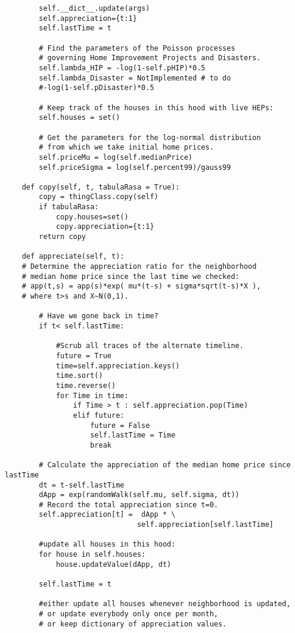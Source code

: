\begin{lstlisting}
        self.__dict__.update(args)
        self.appreciation={t:1}
        self.lastTime = t

        # Find the parameters of the Poisson processes
        # governing Home Improvement Projects and Disasters.
        self.lambda_HIP = -log(1-self.pHIP)*0.5
        self.lambda_Disaster = NotImplemented # to do
        #-log(1-self.pDisaster)*0.5

        # Keep track of the houses in this hood with live HEPs:
        self.houses = set()

        # Get the parameters for the log-normal distribution
        # from which we take initial home prices.
        self.priceMu = log(self.medianPrice)
        self.priceSigma = log(self.percent99)/gauss99
    
    def copy(self, t, tabulaRasa = True):
        copy = thingClass.copy(self)
        if tabulaRasa:
            copy.houses=set()
            copy.appreciation={t:1}
        return copy
            
    def appreciate(self, t):
    # Determine the appreciation ratio for the neighborhood
    # median home price since the last time we checked:
    # app(t,s) = app(s)*exp( mu*(t-s) + sigma*sqrt(t-s)*X ),
    # where t>s and X~N(0,1).

        # Have we gone back in time?
        if t< self.lastTime:
            
            #Scrub all traces of the alternate timeline.
            future = True
            time=self.appreciation.keys()
            time.sort()
            time.reverse()
            for Time in time:
                if Time > t : self.appreciation.pop(Time)
                elif future:
                    future = False
                    self.lastTime = Time
                    break                

        # Calculate the appreciation of the median home price since lastTime
        dt = t-self.lastTime
        dApp = exp(randomWalk(self.mu, self.sigma, dt))
        # Record the total appreciation since t=0.
        self.appreciation[t] =  dApp * \
                               self.appreciation[self.lastTime]

        #update all houses in this hood:
        for house in self.houses:
            house.updateValue(dApp, dt)

        self.lastTime = t
        
        #either update all houses whenever neighborhood is updated,
        # or update everybody only once per month,
        # or keep dictionary of appreciation values.


\end{lstlisting}
